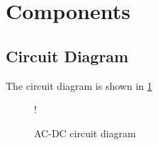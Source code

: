 \documentclass[journal,12pt,twocolumn]{IEEEtran}
\begin{document}
\section{Components}
\begin{table}[!h]
\centering

\caption{}
\label{table:components}
\end{table}
\subsection{Circuit Diagram}
The circuit diagram is shown in \ref{fig1}
\begin{figure}[!h]
\centering
\resizebox {\columnwidth} {!} {

}
\caption{AC-DC circuit diagram} 
\label{fig1}
\end{figure}


\end{document}
